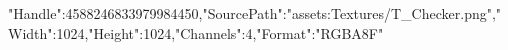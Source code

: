 {"Handle":4588246833979984450,"SourcePath":"assets:Textures/T_Checker.png","Width":1024,"Height":1024,"Channels":4,"Format":"RGBA8F"}